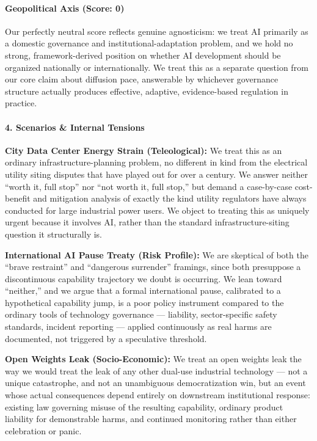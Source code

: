 \paragraph{Geopolitical Axis (Score:
0)}\label{geopolitical-axis-score-0}

Our perfectly neutral score reflects genuine agnosticism: we treat AI
primarily as a domestic governance and institutional-adaptation problem,
and we hold no strong, framework-derived position on whether AI
development should be organized nationally or internationally. We treat
this as a separate question from our core claim about diffusion pace,
answerable by whichever governance structure actually produces
effective, adaptive, evidence-based regulation in practice.

\paragraph{4. Scenarios \& Internal
Tensions}\label{scenarios-internal-tensions-20}

\textbf{City Data Center Energy Strain (Teleological):} We treat this as
an ordinary infrastructure-planning problem, no different in kind from
the electrical utility siting disputes that have played out for over a
century. We answer neither ``worth it, full stop'' nor ``not worth it,
full stop,'' but demand a case-by-case cost-benefit and mitigation
analysis of exactly the kind utility regulators have always conducted
for large industrial power users. We object to treating this as uniquely
urgent because it involves AI, rather than the standard
infrastructure-siting question it structurally is.

\textbf{International AI Pause Treaty (Risk Profile):} We are skeptical
of both the ``brave restraint'' and ``dangerous surrender'' framings,
since both presuppose a discontinuous capability trajectory we doubt is
occurring. We lean toward ``neither,'' and we argue that a formal
international pause, calibrated to a hypothetical capability jump, is a
poor policy instrument compared to the ordinary tools of technology
governance --- liability, sector-specific safety standards, incident
reporting --- applied continuously as real harms are documented, not
triggered by a speculative threshold.

\textbf{Open Weights Leak (Socio-Economic):} We treat an open weights
leak the way we would treat the leak of any other dual-use industrial
technology --- not a unique catastrophe, and not an unambiguous
democratization win, but an event whose actual consequences depend
entirely on downstream institutional response: existing law governing
misuse of the resulting capability, ordinary product liability for
demonstrable harms, and continued monitoring rather than either
celebration or panic.

